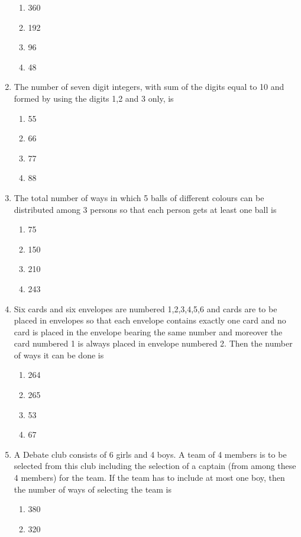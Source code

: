 \begin{enumerate}[label=\arabic*.,ref=\thesubsection.\theenumi]
\begin{enumerate}
\item 360
\item 192
\item 96
\item 48\\
\end{enumerate}
\item The number of seven digit integers, with sum of the digits equal to 10 and formed by using the digits 1,2 and 3 only, is
\begin{enumerate}
\item 55
\item 66
\item 77
\item 88\\
\end{enumerate}
\item The total number of ways in which 5 balls of different colours can be distributed among 3 persons so that each person gets at least one ball is 
\begin{enumerate}
\item 75
\item 150
\item 210
\item 243\\
\end{enumerate}
\item Six cards and six envelopes are numbered 1,2,3,4,5,6 and cards are to be placed in envelopes so that each envelope contains exactly one card and no card is placed in the envelope bearing the same number and moreover the card numbered 1 is always placed in envelope numbered 2. Then the number of ways it can be done is 
\begin{enumerate}
\item 264
\item 265
\item 53
\item 67\\
\end{enumerate} 
\item A Debate club consists of 6 girls and 4 boys. A team of 4 members is to be selected from this club including the selection of a captain (from among these 4 members) for the team. If the team has to include  at most one boy, then the number of ways of selecting the team is 
\begin{enumerate}
\item 380
\item 320

\end{enumerate}
\end{enumerate}
